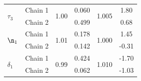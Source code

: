 \begin{table}[H]
\begin{tabular}{lccccc}
\multirow{2}{*}{$\tau_3$} & Chain 1 & \multirow{2}{*}{1.00} & 0.060 & \multirow{2}{*}{1.005} & 1.80 \\
 & Chain 2 & & 0.499 & & 0.68 \\
\midrule
\multirow{2}{*}{$\n_1$} & Chain 1 & \multirow{2}{*}{1.01} & 0.178 & \multirow{2}{*}{1.000} & 1.45 \\
 & Chain 2 & & 0.142 & & -0.31 \\
\midrule
\multirow{2}{*}{$\delta_1$} & Chain 1 & \multirow{2}{*}{0.99} & 0.424 & \multirow{2}{*}{1.010} & -1.70 \\
 & Chain 2 & & 0.062 & & -1.03 \\
\bottomrule
\end{tabular}
\end{table}
